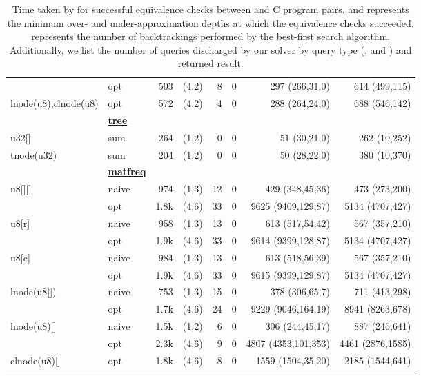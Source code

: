 \begin{table}
\begin{center}
\begin{scriptsize}
\begin{tabular}{@{\hspace{2mm}}l@{\hspace{2mm}}l@{\hspace{2mm}}r@{\hspace{2mm}}c@{\hspace{2mm}}r@{\hspace{2mm}}r@{\hspace{2mm}}r@{\hspace{2mm}}r@{\hspace{2mm}}}
                      & opt          & 503  & (4,2) & 8  & 0 & 297 (266,31,0)      & 614 (499,115)      \\
lnode(u8),clnode(u8)  & opt          & 572  & (4,2) & 4  & 0 & 288 (264,24,0)      & 688 (546,142)      \\
& {\bf \underline{tree}} \\
u32[]                 & sum          & 264  & (1,2) & 0  & 0 & 51 (30,21,0)        & 262 (10,252)       \\
tnode(u32)            & sum          & 204  & (1,2) & 0  & 0 & 50 (28,22,0)        & 380 (10,370)       \\
& {\bf \underline{matfreq}} \\
u8[][]                & naive        & 974  & (1,3) & 12 & 0 & 429 (348,45,36)     & 473 (273,200)      \\
                      & opt          & 1.8k & (4,6) & 33 & 0 & 9625 (9409,129,87)  & 5134 (4707,427)    \\
u8[r]                 & naive        & 958  & (1,3) & 13 & 0 & 613 (517,54,42)     & 567 (357,210)      \\
                      & opt          & 1.9k & (4,6) & 33 & 0 & 9614 (9399,128,87)  & 5134 (4707,427)    \\
u8[c]                 & naive        & 984  & (1,3) & 13 & 0 & 613 (518,56,39)     & 567 (357,210)      \\
                      & opt          & 1.9k & (4,6) & 33 & 0 & 9615 (9399,129,87)  & 5134 (4707,427)    \\
lnode(u8[])           & naive        & 753  & (1,3) & 15 & 0 & 378 (306,65,7)      & 711 (413,298)      \\
                      & opt          & 1.7k & (4,6) & 24 & 0 & 9229 (9046,164,19)  & 8941 (8263,678)    \\
lnode(u8)[]           & naive        & 1.5k & (1,2) & 6  & 0 & 306 (244,45,17)     & 887 (246,641)      \\
                      & opt          & 2.3k & (4,6) & 9  & 0 & 4807 (4353,101,353) & 4461 (2876,1585)   \\
clnode(u8)[]          & opt          & 1.8k & (4,6) & 8  & 0 & 1559 (1504,35,20)   & 2185 (1544,641)    \\
\bottomrule
\end{tabular}
\end{scriptsize}
\end{center}
\caption{\label{tab:testsb}Time taken by \toolName{} for successful equivalence checks between \SpecL{} and C program pairs.
 and  represents the minimum over- and under-approximation depths at which the equivalence checks succeeded.
\btcount{} represents the number of backtrackings performed by the best-first search algorithm.
Additionally, we list the number of queries discharged by our solver by query type (,  and )
and returned result.}
\end{table}